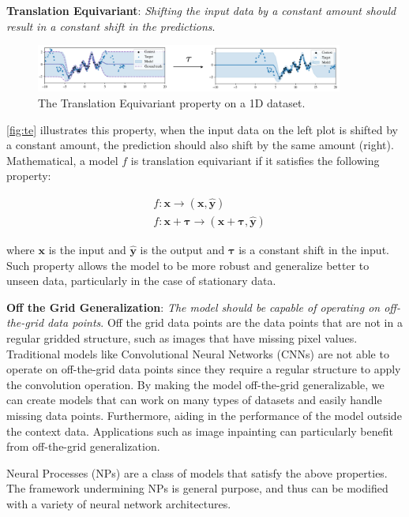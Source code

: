 \documentclass[../../main.tex]{subfiles}
\begin{document}
\textbf{Translation Equivariant}: \emph{Shifting the input data by a constant amount should result in a constant shift in the predictions}. 

\begin{figure}[H]
	\centering
	\includegraphics[width=0.9\textwidth]{./te.png}
	\caption{The Translation Equivariant property on a 1D dataset.}
	\label{fig:te}
\end{figure}


\autoref{fig:te} illustrates this property, when the input data on the left plot is shifted by a constant amount, the prediction should also shift by the same amount (right). Mathematical, a model $f$ is translation equivariant if it satisfies the following property:

\begin{align}
	&f: \bm{x} \rightarrow (\bm{x}, \bm{\hat{y}}) \\
	&f: \bm{x} + \bm{\tau} \rightarrow (\bm{x} + \bm{\tau}, \bm{\hat{y}})
\end{align}

where $\bm{x}$ is the input and $\bm{\hat{y}}$ is the output and $\bm{\tau}$ is a constant shift in the input. Such property allows the model to be more robust and generalize better to unseen data, particularly in the case of stationary data.


\textbf{Off the Grid Generalization}: \emph{The model should be capable of operating on off-the-grid data points}. Off the grid data points are the data points that are not in a regular gridded structure, such as images that have missing pixel values. Traditional models like Convolutional Neural Networks (CNNs) are not able to operate on off-the-grid data points since they require a regular structure to apply the convolution operation. By making the model off-the-grid generalizable, we can create models that can work on many types of datasets and easily handle missing data points. Furthermore, aiding in the performance of the model outside the context data. Applications such as image inpainting can particularly benefit from off-the-grid generalization.


Neural Processes (NPs) \cite{garnelo2018neural} are a class of models that satisfy the above properties. The framework undermining NPs is general purpose, and thus can be modified with a variety of neural network architectures. 
\end{document}
